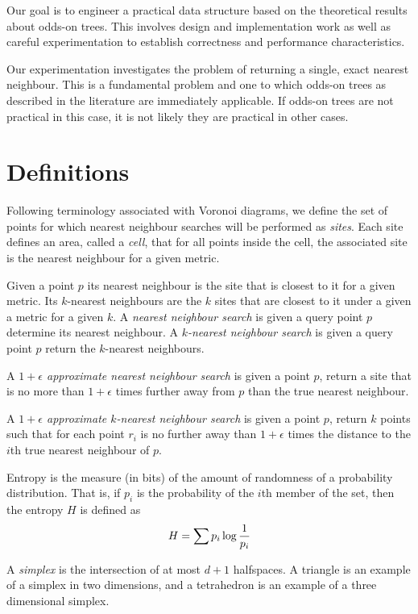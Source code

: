 \documentclass[mcs]{scsthesis}
\begin{document}
Our goal is to engineer a practical data structure based on the theoretical
results about odds-on trees. This involves design and implementation work as
well as careful experimentation to establish correctness and performance
characteristics.

Our experimentation investigates the problem of returning a single, exact
nearest neighbour. This is a fundamental problem and one to which odds-on trees
as described in the literature are immediately applicable. If odds-on trees are
not practical in this case, it is not likely they are practical in other cases.

\section{Definitions}

Following terminology associated with Voronoi diagrams, we define the set of
points for which nearest neighbour searches will be performed as \emph{sites}.
Each site defines an area, called a \emph{cell}, that for all points inside the
cell, the associated site is the nearest neighbour for a given metric.

Given a point \(p\) its nearest neighbour is the site that is closest to it
for a given metric. Its $k$-nearest neighbours are the $k$ sites that are
closest to it under a given a metric for a given $k$.  A \emph{nearest neighbour
search} is given a query point \(p\) determine its nearest neighbour.
A \emph{\(k\)-nearest neighbour search} is given a query point \(p\) return the
$k$-nearest neighbours.

A \emph{\(1 + \epsilon\) approximate nearest neighbour search} is given a point
\(p\), return a site that is no more than \(1 + \epsilon\) times further away
from $p$ than the true nearest neighbour.

A \emph{\(1 + \epsilon\) approximate \(k\)-nearest neighbour search} is given a
point \(p\), return \(k\) points such that for each point \(r_i\) is no further
away than \(1 + \epsilon\) times the distance to the \(i\)th true nearest
neighbour of $p$.

Entropy is the measure (in bits) of the amount of randomness of a probability
distribution.  That is, if \(p_i\) is the probability of the $i$th member of the
set, then the entropy \(H\) is defined as
$$
H = \sum{ p_i \log{1 \over p_i}}
$$

A \emph{simplex} is the intersection of at most \(d + 1\) halfspaces. A triangle
is an example of a simplex in two dimensions, and a tetrahedron is an example of
a three dimensional simplex.
\end{document}
